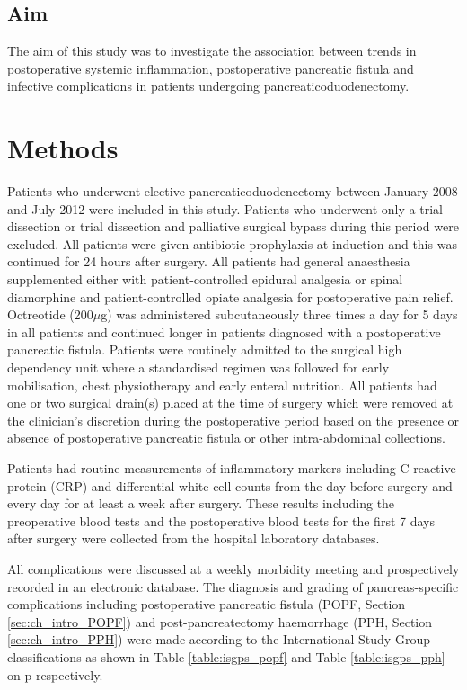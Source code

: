 \subsection{Aim}
The aim of this study was to investigate the association between trends in postoperative systemic inflammation, postoperative pancreatic fistula and infective complications in patients undergoing pancreaticoduodenectomy.

\clearpage
\section{Methods}

Patients who underwent elective pancreaticoduodenectomy between January 2008 and July 2012 were included in this study. 
Patients who underwent only a trial dissection or trial dissection and palliative surgical bypass during this period were excluded. 
All patients were given antibiotic prophylaxis at induction and this was continued for 24 hours after surgery. 
All patients had general anaesthesia supplemented either with patient-controlled epidural analgesia or spinal diamorphine and patient-controlled opiate analgesia for postoperative pain relief. 
Octreotide (200$\mu$g) was administered subcutaneously three times a day for 5 days in all patients and continued longer in patients diagnosed with a postoperative pancreatic fistula. 
Patients were routinely admitted to the surgical high dependency unit where a standardised regimen was followed for early mobilisation, chest physiotherapy and early enteral nutrition. 
All patients had one or two surgical drain(s) placed at the time of surgery which were removed at the clinician's discretion during the postoperative period based on the presence or absence of postoperative pancreatic fistula or other intra-abdominal collections. 

Patients had routine measurements of inflammatory markers including C-reactive protein (CRP) and differential white cell counts from the day before surgery and every day for at least a week after surgery. 
These results including the preoperative blood tests and the postoperative blood tests for the first 7 days after surgery were collected from the hospital laboratory databases.

All complications were discussed at a weekly morbidity meeting and prospectively recorded in an electronic database.  The diagnosis and grading of pancreas-specific complications including postoperative pancreatic fistula (POPF, Section \ref{sec:ch_intro_POPF}) and post-pancreatectomy haemorrhage (PPH, Section \ref{sec:ch_intro_PPH}) were made according to the International Study Group classifications as shown in Table \ref{table:isgps_popf} and Table \ref{table:isgps_pph} on p\pageref{table:isgps_popf} respectively.

